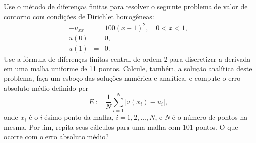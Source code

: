 \begin{ex}\label{ex:pvc2}
  Use o método de diferenças finitas para resolver o seguinte problema de valor de contorno com condições de Dirichlet homogêneas:
  \begin{eqnarray}
    -u_{xx} &=& 100(x-1)^2,\quad 0 < x < 1,\label{eq:pvc2-eq}\\
    u(0) &=& 0,\label{eq:pvc2-bc1}\\
    u(1) &=& 0.\label{eq:pvc2-bc2}
  \end{eqnarray}
Use a fórmula de diferenças finitas central de ordem 2 para discretizar a derivada em uma malha uniforme de 11 pontos. Calcule, também, a solução analítica deste problema, faça um esboço das soluções numérica e analítica, e compute o erro absoluto médio definido por
\begin{equation*}
  E := \frac{1}{N}\sum_{i=1}^N |u(x_i) - u_i|,
\end{equation*}
onde $x_i$ é o $i$-ésimo ponto da malha, $i=1, 2, \dotsc, N$, e $N$ é o número de pontos na mesma. Por fim, repita seus cálculos para uma malha com $101$ pontos. O que ocorre com o erro absoluto médio?
\end{ex}

